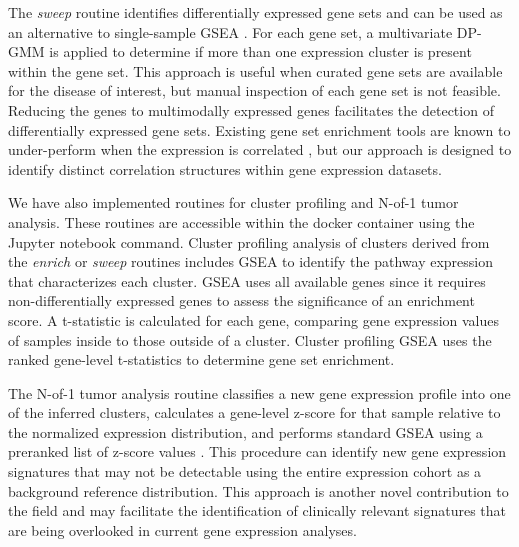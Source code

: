 \documentclass[10pt,letterpaper]{article}
\begin{document}
The \textit{sweep} routine identifies differentially expressed gene sets and can be used as an alternative to single-sample GSEA \cite{subramanianGeneSetEnrichment2005}. For each gene set, a multivariate DP-GMM is applied to determine if more than one expression cluster is present within the gene set. This approach is useful when curated gene sets are available for the disease of interest, but manual inspection of each gene set is not feasible. Reducing the genes to multimodally expressed genes facilitates the detection of differentially expressed gene sets. Existing gene set enrichment tools are known to under-perform when the expression is correlated \cite{tamayoLimitationsSimpleGene2016}, but our approach is designed to identify distinct correlation structures within gene expression datasets.

We have also implemented routines for cluster profiling and N-of-1 tumor analysis. These routines are accessible within the docker container using the Jupyter notebook command. Cluster profiling analysis of clusters derived from the \textit{enrich} or \textit{sweep} routines includes GSEA \cite{korotkevichFastGeneSet2019} to identify the pathway expression that characterizes each cluster. GSEA uses all available genes since it requires non-differentially expressed genes to assess the significance of an enrichment score. A t-statistic is calculated for each gene, comparing gene expression values of samples inside to those outside of a cluster. Cluster profiling GSEA uses the ranked gene-level t-statistics to determine gene set enrichment.

The N-of-1 tumor analysis routine classifies a new gene expression profile into one of the inferred clusters, calculates a gene-level z-score for that sample relative to the normalized expression distribution, and performs standard GSEA using a preranked list of z-score values \cite{korotkevichFastGeneSet2019}. This procedure can identify new gene expression signatures that may not be detectable using the entire expression cohort as a background reference distribution. This approach is another novel contribution to the field and may facilitate the identification of clinically relevant signatures that are being overlooked in current gene expression analyses.
\end{document}
